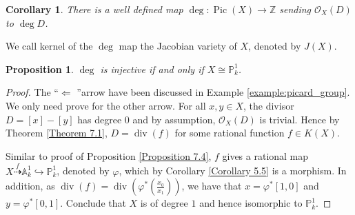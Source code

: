 \documentclass{ctexart}
\newtheorem{proposition}{Proposition}[section]
\newtheorem{corollary}{Corollary}[section]
\newcommand{\leftquotes}{\textquotedblleft}
\newcommand{\rightquotes}{\textquotedblright}
\newcommand{\picardscheme}{\operatorname{Pic}}
\newcommand{\divisor}{\operatorname{div}}
\begin{document}
\begin{corollary}
    There is a well defined map $\deg: \picardscheme (X) \rightarrow \mathbb{Z}$ sending $\mathcal{O}_{X}(D)$ to $\deg D$.
    \label{Corollary 7.2}
\end{corollary}
We call kernel of the $\deg$ map the Jacobian variety of $X$, denoted by $J(X)$.
\begin{proposition}
    $\deg$ is injective if and only if $X \cong \mathbb{P}_{k}^{1}$.
    \label{Proposition 7.5}
\end{proposition}
\begin{proof}
    The \leftquotes $\Leftarrow$ \rightquotes arrow have been discussed in Example \ref{example:picard_group}.
    We only need prove for the other arrow.
    For all $x, y\in X$, the divisor $D = [x] - [y]$ has degree $0$ and by assumption, $\mathcal{O}_{X}(D)$ is trivial.
    Hence by Theorem \ref{Theorem 7.1}, $D = \divisor (f)$ for some rational function $f\in K(X)$.
    \par
    Similar to proof of Proposition \ref{Proposition 7.4}, $f$ gives a rational map $X \overset{f}{\dashrightarrow} \mathbb{A}_{k}^{1} \hookrightarrow \mathbb{P}_{k}^{1}$, 
    denoted by $\varphi$, which by Corollary \ref{Corollary 5.5} is a morphism.
    In addition, as $\divisor (f) = \divisor (\varphi^{\ast}(\frac{x_{0}}{x_{1}}))$, we have that $x = \varphi^{\ast}[1, 0]$ and $y = \varphi^{\ast}[0, 1]$.
    Conclude that $X$ is of degree $1$ and hence isomorphic to $\mathbb{P}_{k}^{1}$.  
\end{proof}
\end{document}
